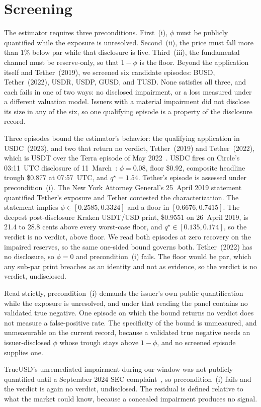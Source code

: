 \section{Screening}
\label{sec:spec}

The estimator requires three preconditions. First~(i), $\phi$ must be publicly
quantified while the exposure is unresolved. Second~(ii), the price must fall more
than $1\%$ below par while that disclosure is live. Third~(iii), the fundamental
channel must be reserve-only, so that $1-\phi$ is the floor. Beyond the application
itself and Tether~(2019), we screened six candidate episodes: BUSD, Tether~(2022),
USDR, USDP, GUSD, and TUSD. None satisfies all three, and each fails in one of two
ways: no disclosed impairment, or a loss measured under a different valuation model.
Issuers with a material impairment did not disclose its size in any of the six, so one
qualifying episode is a property of the disclosure record.

Three episodes bound the estimator's behavior: the qualifying application in
USDC~(2023), and two that return no verdict, Tether~(2019) and Tether~(2022), which is
USDT over the Terra episode of May 2022~\cite{liumakarovschoar2023}. USDC fires on Circle's 03{:}11~UTC disclosure of
11~March~\cite{circle2023tweet}: $\phi=0.08$, floor \$0.92, composite headline trough
\$0.877 at 07{:}57~UTC, and $q^{\star}=1.54$. Tether's episode is assessed under
precondition~(i). The New York Attorney General's 25~April 2019
statement~\cite{nyag2019tether} quantified Tether's exposure and Tether contested the
characterization. The statement implies
$\phi\in[0.2585,\allowbreak 0.3324]$ and a floor in $[0.6676,\allowbreak 0.7415]$. The deepest post-disclosure Kraken USDT/USD print, \$0.9551
on 26~April 2019, is 21.4 to 28.8 cents above every worst-case floor, and
$q^{\star}\in[0.135,0.174]$, so the verdict is no verdict, above floor.
We read both
episodes at zero recovery on the impaired reserves, so the same one-sided bound
governs both. Tether~(2022) has no disclosure, so $\phi=0$ and
precondition~(i) fails. The floor would be par, which any sub-par print breaches as an
identity and not as evidence, so the verdict is no verdict, undisclosed.

Read strictly, precondition~(i) demands the issuer's own public quantification while
the exposure is unresolved, and under that reading the panel contains no validated
true negative. One episode on which the bound returns no verdict does not measure a
false-positive rate. The specificity of the bound is unmeasured, and unmeasurable on the
current record, because a validated true negative needs an issuer-disclosed $\phi$ whose
trough stays above $1-\phi$, and no screened episode supplies one.

TrueUSD's unremediated impairment during our window was not publicly quantified until a
September 2024 SEC complaint~\cite{sectruecoin2024}, so precondition~(i) fails and the
verdict is again no verdict, undisclosed. The residual is defined relative to
what the market could know, because a concealed impairment produces no signal.
